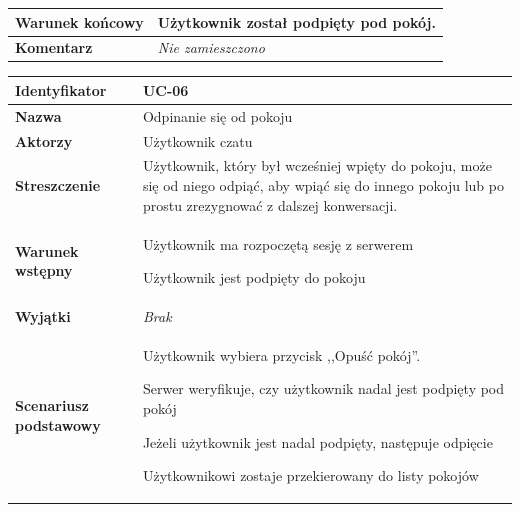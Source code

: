 {\begin{tabular}{ | l | l | }
	\hline
		\parbox[t]{4cm}{\textbf{Warunek końcowy}} & \parbox[t]{11cm}{
			Użytkownik został podpięty pod pokój.
		}
		\\
		
	\hline
		\parbox[t]{4cm}{\textbf{Komentarz}} & \parbox[t]{11cm}{
			\textit{Nie zamieszczono}
		}
		\\

	\hline
\end{tabular}

\vspace{2em}

\begin{tabular}{ | l | l | }
	\hline
		\textbf{Identyfikator} & 
		UC-06
		\\
		
	\hline
		\textbf{Nazwa} & 
		Odpinanie się od pokoju
		\\
		
	\hline
		\textbf{Aktorzy} & \parbox[t]{11cm}{
			Użytkownik czatu
		}\\
		 
	\hline
		\parbox[t]{4cm}{\textbf{Streszczenie}} & \parbox[t]{11cm}{
			Użytkownik, który był wcześniej wpięty do pokoju, może się
			od niego odpiąć, aby wpiąć się do innego pokoju lub po prostu
			zrezygnować z dalszej konwersacji.
			
		}\\
		
	\hline
		\parbox[t]{4cm}{\textbf{Warunek wstępny}} & \parbox[t]{11cm}{
			\begin{enumreq}
				\item Użytkownik ma rozpoczętą sesję z serwerem
				\item Użytkownik jest podpięty do pokoju
			\end{enumreq}
				
		}
		\\
		
	\hline
		\parbox[t]{4cm}{\textbf{Wyjątki}} & \parbox[t]{11cm}{
			\textit{Brak}
			
		}
		\\

	\hline
		\parbox[t]{4cm}{\textbf{Scenariusz podstawowy}} & \parbox[t]{11cm}{
			\begin{enumreq}
				\item Użytkownik wybiera przycisk ,,Opuść pokój''.
				\item Serwer weryfikuje, czy użytkownik nadal jest podpięty
				pod pokój
				\item Jeżeli użytkownik jest nadal podpięty, następuje
				odpięcie
				\item Użytkownikowi zostaje przekierowany do listy pokojów
			\end{enumreq}
		}
		\\
		

\end{tabular}}

